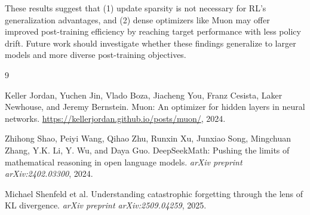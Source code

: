 \documentclass[11pt]{article}
\begin{document}
These results suggest that (1) update sparsity is not necessary for RL's generalization advantages, and (2) dense optimizers like Muon may offer improved post-training efficiency by reaching target performance with less policy drift. Future work should investigate whether these findings generalize to larger models and more diverse post-training objectives.



\begin{thebibliography}{9}

Keller Jordan, Yuchen Jin, Vlado Boza, Jiacheng You, Franz Cesista, Laker Newhouse, and Jeremy Bernstein.
\newblock Muon: An optimizer for hidden layers in neural networks.
\newblock \url{https://kellerjordan.github.io/posts/muon/}, 2024.

Zhihong Shao, Peiyi Wang, Qihao Zhu, Runxin Xu, Junxiao Song, Mingchuan Zhang, Y.K. Li, Y. Wu, and Daya Guo.
\newblock DeepSeekMath: Pushing the limits of mathematical reasoning in open language models.
\newblock \emph{arXiv preprint arXiv:2402.03300}, 2024.

Michael Shenfeld et al.
\newblock Understanding catastrophic forgetting through the lens of KL divergence.
\newblock \emph{arXiv preprint arXiv:2509.04259}, 2025.

\end{thebibliography}
\end{document}
